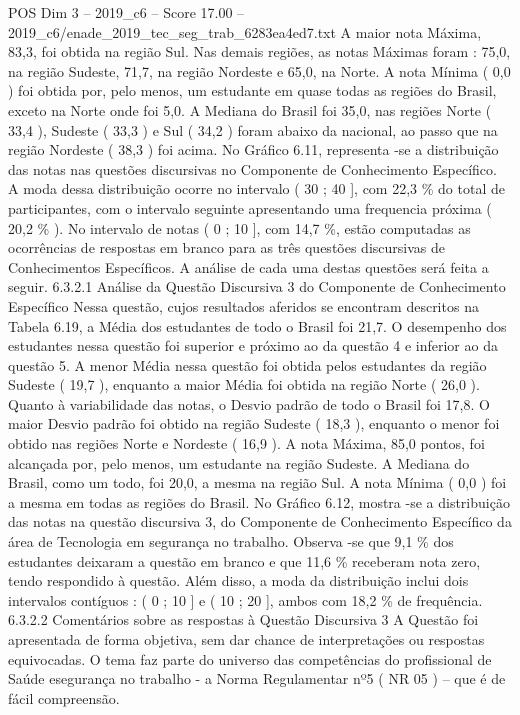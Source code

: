 \begin{textsample}{POS Dim 3 – 2019\_c6 – Score 17.00 – 2019\_c6/enade\_2019\_tec\_seg\_trab\_6283ea4ed7.txt}
A maior nota Máxima, 83,3, foi obtida na região Sul.
Nas demais regiões, as notas Máximas foram : 75,0, na região Sudeste, 71,7, na região Nordeste e 65,0, na Norte.
A nota Mínima ( 0,0 ) foi obtida por, pelo menos, um estudante em quase todas as regiões do Brasil, exceto na Norte onde foi 5,0.
A Mediana do Brasil foi 35,0, nas regiões Norte ( 33,4 ), Sudeste ( 33,3 ) e Sul ( 34,2 ) foram abaixo da nacional, ao passo que na região Nordeste ( 38,3 ) foi acima.
No Gráfico 6.11, representa -se a distribuição das notas nas questões discursivas no Componente de Conhecimento Específico.
A moda dessa distribuição ocorre no intervalo ( 30 ; 40 ], com 22,3 \% do total de participantes, com o intervalo seguinte apresentando uma frequencia próxima ( 20,2 \% ).
No intervalo de notas ( 0 ; 10 ], com 14,7 \%, estão computadas as ocorrências de respostas em branco para as três questões discursivas de Conhecimentos Específicos.
A análise de cada uma destas questões será feita a seguir. 6.3.2.1 Análise da Questão Discursiva 3 do Componente de Conhecimento Específico Nessa questão, cujos resultados aferidos se encontram descritos na Tabela 6.19, a Média dos estudantes de todo o Brasil foi 21,7.
O desempenho dos estudantes nessa questão foi superior e próximo ao da questão 4 e inferior ao da questão 5.
A menor Média nessa questão foi obtida pelos estudantes da região Sudeste ( 19,7 ), enquanto a maior Média foi obtida na região Norte ( 26,0 ).
Quanto à variabilidade das notas, o Desvio padrão de todo o Brasil foi 17,8.
O maior Desvio padrão foi obtido na região Sudeste ( 18,3 ), enquanto o menor foi obtido nas regiões Norte e Nordeste ( 16,9 ).
A nota Máxima, 85,0 pontos, foi alcançada por, pelo menos, um estudante na região Sudeste.
A Mediana do Brasil, como um todo, foi 20,0, a mesma na região Sul.
A nota Mínima ( 0,0 ) foi a mesma em todas as regiões do Brasil.
No Gráfico 6.12, mostra -se a distribuição das notas na questão discursiva 3, do Componente de Conhecimento Específico da área de Tecnologia em segurança no trabalho.
Observa -se que 9,1 \% dos estudantes deixaram a questão em branco e que 11,6 \% receberam nota zero, tendo respondido à questão.
Além disso, a moda da distribuição inclui dois intervalos contíguos : ( 0 ; 10 ] e ( 10 ; 20 ], ambos com 18,2 \% de frequência. 6.3.2.2 Comentários sobre as respostas à Questão Discursiva 3 A Questão foi apresentada de forma objetiva, sem dar chance de interpretações ou respostas equivocadas.
O tema faz parte do universo das competências do profissional de Saúde esegurança no trabalho - a Norma Regulamentar nº5 ( NR 05 ) – que é de fácil compreensão.

\end{textsample}
